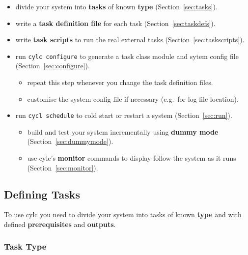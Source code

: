 \documentclass[11pt,a4paper]{article}
\begin{document}
\begin{itemize}
    \item divide your system into {\bf tasks} of known {\bf type}
        (Section~\ref{sec:tasks}).

    \item write a {\bf task definition file} for each task
        (Section~\ref{sec:taskdefs}).

    \item write {\bf task scripts} to run the real external tasks 
        (Section~\ref{sec:taskscripts}).

    \item run \lstinline=cylc configure= to generate a task class module and
        sytem config file (Section~\ref{sec:configure}).

    \begin{itemize}
        \item repeat this step whenever you change the task definition files.
        \item customise the system config file if necessary (e.g.\ for
            log file location).
    \end{itemize}

    \item run \lstinline=cycl schedule= to cold start or restart a system
        (Section~\ref{sec:run}).

    \begin{itemize}

        \item build and test your system incrementally using {\bf dummy
            mode} (Section~\ref{sec:dummymode}).

        \item use cylc's {\bf monitor} commands to display follow the
            system as it runs (Section~\ref{sec:monitor}).
    \end{itemize}

\end{itemize}

\pagebreak
\label{sec:tasktype}
\subsection{Defining Tasks}

To use cylc you need to divide your system into tasks of known {\bf
type} and with defined {\bf prerequisites} and {\bf outputs}.

\label{sec:tasktype}
\subsubsection{Task Type}
\end{document}

